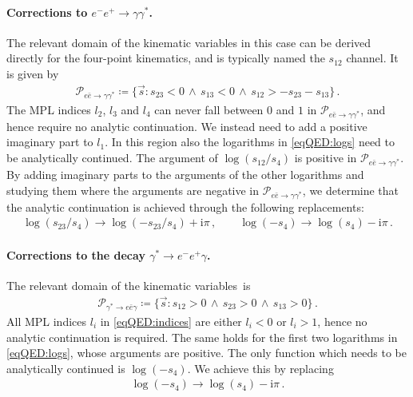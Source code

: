 \documentclass[main.tex]{subfiles}
\begin{document}
\smallskip

\paragraph{Corrections to $e^- e^+ \to \gamma \gamma^*$.} The relevant domain of the kinematic variables in this case can be derived directly for the four-point kinematics, and is typically named the $s_{12}$ channel. It is given by 
\begin{align}
\label{eq:region_eebar}
\mathcal{P}_{e\bar{e}\to\gamma\gamma^*} \coloneqq \{\vec{s} \colon s_{23} < 0 \, \land \, s_{13} < 0 \, \land \, s_{12} > - s_{23} - s_{13} \} \,.
\end{align}
The MPL indices $l_2$, $l_3$ and $l_4$ can never fall between $0$ and $1$ in $\mathcal{P}_{e\bar{e}\to\gamma\gamma^*}$, and hence require no analytic continuation. We instead need to add a positive imaginary part to $l_1$. 
In this region also the logarithms in \cref{eqQED:logs} need to be analytically continued. The argument of $\log(s_{12}/s_4)$ is positive in $\mathcal{P}_{e\bar{e}\to\gamma\gamma^*}$. By adding imaginary parts to the arguments of the other logarithms and studying them where the arguments are negative in $\mathcal{P}_{e\bar{e}\to\gamma\gamma^*}$, we determine that the analytic continuation is achieved through the following replacements:
\begin{align}
\log(s_{23}/s_4) \longrightarrow \log(-s_{23}/s_{4})+ \mathrm{i} \pi \,, \qquad  \log(-s_4) \longrightarrow \log(s_4)- \mathrm{i} \pi \,.
\end{align}


\paragraph{Corrections to the decay $\gamma^* \to e^- e^+ \gamma$.} The relevant domain of the kinematic variables~is
\begin{align}
\label{eq:region_decay}
\mathcal{P}_{\gamma^*\to e \bar{e} \gamma} \coloneqq  \{ \vec{s} \colon s_{12} > 0 \, \land \, s_{23} > 0 \, \land \,  s_{13} > 0 \} \,.
\end{align}
All MPL indices $l_i$ in \cref{eqQED:indices} are either $l_i < 0$ or $l_i > 1$, hence no analytic continuation is required. The same holds for the first two logarithms in \cref{eqQED:logs}, whose arguments are positive. The only function which needs to be analytically continued is $\log(-s_4)$. We achieve this by replacing
\begin{align}
\log(-s_4) \longrightarrow \log(s_{4}) - \mathrm{i} \pi \,.
\end{align}
\end{document}
